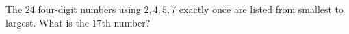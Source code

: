 The $24$ four-digit numbers using $2,4,5,7$ exactly once are listed from smallest to largest. What is the $17$th number?

